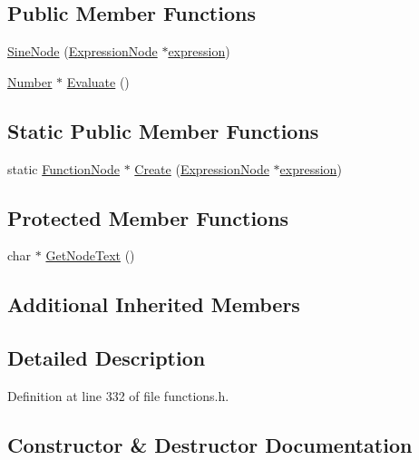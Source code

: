 \subsection*{Public Member Functions}
\begin{DoxyCompactItemize}
\item 
\hyperlink{classSineNode_ab53ea597377849c487fc4e63157d4f6d}{Sine\+Node} (\hyperlink{classExpressionNode}{Expression\+Node} $\ast$\hyperlink{classFunctionNode_ad7577b179a1937aaf8a0058bb5b546dc}{expression})
\item 
\hyperlink{structNumber}{Number} $\ast$ \hyperlink{classSineNode_a9b1ee27ee5d63e44ce09602b91f633cc}{Evaluate} ()
\end{DoxyCompactItemize}
\subsection*{Static Public Member Functions}
\begin{DoxyCompactItemize}
\item 
static \hyperlink{classFunctionNode}{Function\+Node} $\ast$ \hyperlink{classSineNode_ae1c55d727e6560dfc00a7c66d818c47a}{Create} (\hyperlink{classExpressionNode}{Expression\+Node} $\ast$\hyperlink{classFunctionNode_ad7577b179a1937aaf8a0058bb5b546dc}{expression})
\end{DoxyCompactItemize}
\subsection*{Protected Member Functions}
\begin{DoxyCompactItemize}
\item 
char $\ast$ \hyperlink{classSineNode_aceeb647bdd020764589ec00039157ae0}{Get\+Node\+Text} ()
\end{DoxyCompactItemize}
\subsection*{Additional Inherited Members}


\subsection{Detailed Description}


Definition at line 332 of file functions.\+h.



\subsection{Constructor \& Destructor Documentation}
